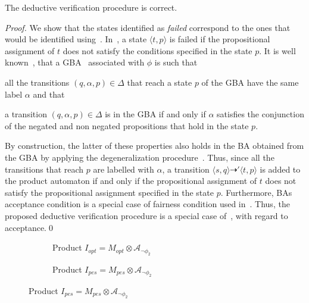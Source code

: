 \begin{theorem}
\label{th:deductivecorrecteness}
The deductive verification procedure is correct.
\end{theorem}

\begin{proof}
We show that the states identified as \emph{failed}  correspond to the ones that would be identified using~\cite{peled2001model}. 
In~\cite{peled2001model}, a state $\langle t, p \rangle$ is failed if the propositional assignment of $t$ does not satisfy the conditions specified in the state $p$. 
It is well known~\cite{gerth1996ltl2ba,clarke1999model}, that a GBA \gba\ associated with $\phi$ is such that
\begin{enumerate*}[label={(\arabic*)}]
\item all the transitions $(q,\alpha, p) \in \Delta$ that reach a state $p$ of the GBA have the same label $\alpha$ and that
\item a transition $(q,\alpha, p) \in \Delta$ is in the GBA  if and only if $\alpha$ satisfies the conjunction of the negated and non negated propositions that hold in the state $p$.
\end{enumerate*}
By construction, the latter of these properties also holds in the BA obtained from the GBA by applying the degeneralization procedure~\cite{clarke1999model}.
Thus, since all the transitions that reach $p$ are labelled with $\alpha$, a transition $\langle s,q \rangle \dashrightarrow' \langle t,p \rangle$ is added to the product automaton if and only if the propositional assignment of $t$ does not satisfy the propositional assignment specified in the state $p$. 
Furthermore, BAs acceptance condition is a special case of fairness condition used in~\cite{peled2001model}. 
Thus, the proposed deductive verification procedure is a special case of~\cite{peled2001model}, with regard to acceptance.\qed
\end{proof}

\begin{figure}[t]
\begin{minipage}[b]{.5\textwidth}
  \begin{figure}[H]
\centering

\caption{Product $I_{opt}=M_{opt}\otimes\mathcal{A}_{\lnot\phi_2}$}
\label{fig:productOpt}
 \end{figure}
\end{minipage}%
\begin{minipage}[b]{.5\textwidth}
  \begin{figure}[H]
\centering

\caption{Product $I_{pes}=M_{pes}\otimes\mathcal{A}_{\lnot\phi_2}$}
\label{fig:productPess}
 \end{figure}
\end{minipage}%
\end{figure}
